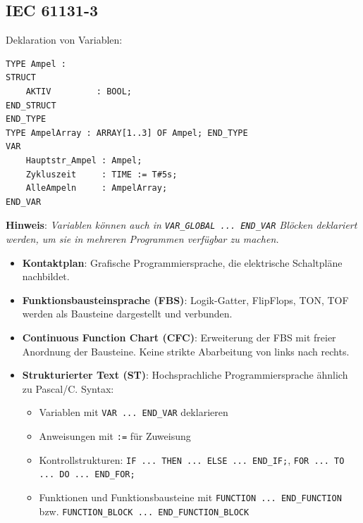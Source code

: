 \documentclass[10pt, a3paper, landscape]{article}
\newcommand{\algo}[1]{\textbf{\textcolor{blue!60!black}{#1}}}
\begin{document}
\begin{multicols*}{4}
\begin{itemize}
\section{IEC 61131-3}
Deklaration von Variablen:

\begin{lstlisting}[language=ST, numbers=none]
TYPE Ampel :
STRUCT
    AKTIV         : BOOL;
END_STRUCT
END_TYPE
TYPE AmpelArray : ARRAY[1..3] OF Ampel; END_TYPE
VAR
    Hauptstr_Ampel : Ampel;
    Zykluszeit     : TIME := T#5s;
    AlleAmpeln     : AmpelArray;
END_VAR
\end{lstlisting}

\algo{Hinweis}: \textit{Variablen können auch in \lstinline|VAR_GLOBAL ... END_VAR| Blöcken deklariert werden, um sie in mehreren Programmen verfügbar zu machen.}

\begin{itemize}
\item \algo{Kontaktplan}: Grafische Programmiersprache, die elektrische Schaltpläne nachbildet.
\begin{itemize}
    \item \texttt{--\verb|][--}: Öffner
    \item \texttt{--\verb|]\textbackslash{}[--}: Schließer 
    \item \texttt{--()\!--}: Spule (Aktor)
\end{itemize}
\item \algo{Funktionsbausteinsprache (FBS)}: Logik-Gatter, FlipFlops, TON, TOF werden als Bausteine dargestellt und verbunden.
\item \algo{Continuous Function Chart (CFC)}: Erweiterung der FBS mit freier Anordnung der Bausteine. Keine strikte Abarbeitung von links nach rechts.
\item \algo{Strukturierter Text (ST)}: Hochsprachliche Programmiersprache ähnlich zu Pascal/C. Syntax: 

\begin{itemize}
    \item Variablen mit \lstinline|VAR ... END_VAR| deklarieren
    \item Anweisungen mit \lstinline|:=| für Zuweisung
    \item Kontrollstrukturen: \lstinline|IF ... THEN ... ELSE ... END_IF;|, \lstinline|FOR ... TO ... DO ... END_FOR;|
    \item Funktionen und Funktionsbausteine mit \lstinline|FUNCTION ... END_FUNCTION| bzw. \lstinline|FUNCTION_BLOCK ... END_FUNCTION_BLOCK|
\end{itemize}


\end{itemize}
\end{itemize}
\end{multicols*}
\end{document}
